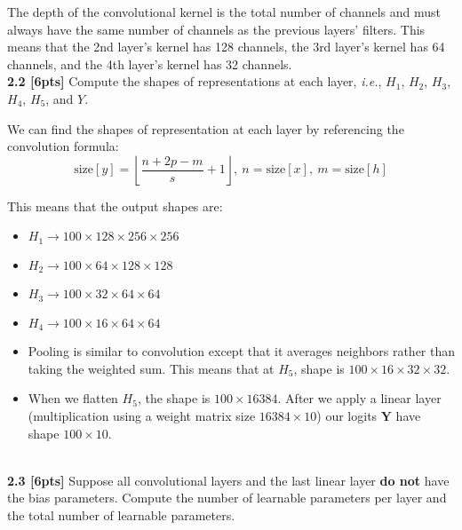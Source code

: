 \documentclass{article}
\begin{document}
{\color{blue}
The depth of the convolutional kernel is the total number of channels and must always have the same number of channels as the previous layers' filters. This means that the 2nd layer's kernel has 128 channels, the 3rd layer's kernel has 64 channels, and the 4th layer's kernel has 32 channels.
}\\

\noindent
\textbf{2.2 [6pts]} Compute the shapes of representations at each layer, \textit{i.e.}, $H_1$, $H_2$, $H_3$, $H_4$, $H_5$, and $Y$.\\

{\color{blue}
We can find the shapes of representation at each layer by referencing the convolution formula:
\begin{equation}
    \text{size}[y]= \left \lfloor \frac{n+2p-m}{s} +1\right \rfloor, \ n=\text{size}[x], \ m=\text{size}[h]
\end{equation}

This means that the output shapes are:
\begin{itemize}
    \item $H_1 \rightarrow 100 \times 128 \times 256 \times 256$
    \item $H_2 \rightarrow 100 \times 64 \times 128 \times 128$
    \item $H_3 \rightarrow 100 \times 32 \times 64 \times 64$
    \item $H_4 \rightarrow 100 \times 16 \times 64 \times 64$
    \item Pooling is similar to convolution except that it averages neighbors rather than taking the weighted sum. This means that at $H_5$, shape is $100 \times 16 \times 32 \times 32$. 
    \item When we flatten $H_5$, the shape is $100 \times 16384$. After we apply a linear layer (multiplication using a weight matrix size $16384 \times 10$) our logits $\mathbf{Y}$ have shape $100 \times 10$.
\end{itemize}
}\\

\noindent
\textbf{2.3 [6pts]} Suppose all convolutional layers and the last linear layer \textbf{do not} have the bias parameters. Compute the number of learnable parameters per layer and the total number of learnable parameters.\\
\end{document}
